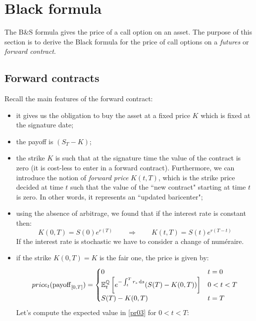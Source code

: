 \section{Black formula} 
The B\&S formula gives the price of a call option on an asset. The purpose of this section is to derive the Black formula for the price of call options on a \emph{futures} or \emph{forward contract}.\\

\subsection{Forward contracts} %
Recall the main features of the forward contract:
\begin{itemize}
    \item it gives us the obligation to buy the asset at a fixed price $K$ which is fixed at the signature date;
    \item the payoff is $(S_T-K)$;
    \item the strike $K$ is such that at the signature time the value of the contract is zero (it is cost-less to enter in a forward contract). Furthermore, we can introduce the notion of \emph{forward price} $K(t,T)$, which is the strike price decided at time $t$ such that the value of the ``new contract" starting at time $t$ is zero. In other words, it represents an ``updated baricenter";
    \item using the absence of arbitrage, we found that if the interest rate is constant then:
    \begin{equation}
        K(0,T) = S(0)e^{r(T)} \qquad\Rightarrow\qquad K(t,T) = S(t)e^{r(T-t)}
    \end{equation}
    If the interest rate is stochastic we have to consider a change of numéraire.
    \item if the strike $K(0,T)=K$ is the fair one, the price is given by:
    \begin{equation}\label{pr03}
        price_t(\operatorname{payoff}_{[0,T]}) = 
        \begin{cases}
        0 & t=0 \\
        \mathbb{E}^{\mathbb{Q}}_t\left[e^{-\int_t^T r_s\,\dd s}(S(T)-K(0,T))\right] & 0<t<T \\
        S(T)-K(0,T) & t=T
        \end{cases}
    \end{equation}
    Let's compute the expected value in \eqref{pr03} for $0<t<T$:
    \begin{align*}

\end{align*}
\end{itemize}
